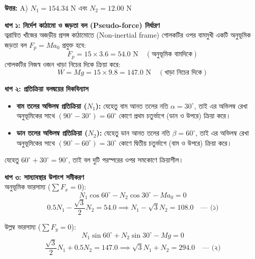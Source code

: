 \documentclass[12pt, a4paper]{article}
\begin{document}
\vspace{0.5em}
\begin{tcolorbox}[answerbox]
    \textbf{\color{success} উত্তর:} A) $N_1 = 154.34\text{ N}$ এবং $N_2 = 12.00\text{ N}$
\end{tcolorbox}
\vspace{1em}

\begin{tcolorbox}[solutionbox={সমাধান (Solution)}]
    \noindent
    \textbf{ধাপ ১: নির্দেশ কাঠামো ও জড়তা বল (Pseudo-force) নির্ধারণ} \\
    ত্বরান্বিত খাঁজের অজড়ীয় প্রসঙ্গ কাঠামোতে (Non-inertial frame) গোলকটির ওপর বামমুখী একটি অনুভূমিক জড়তা বল $F_p = M a_0$ প্রযুক্ত হবে:
    \[ F_p = 15 \times 3.6 = 54.0\text{ N} \quad (\text{অনুভূমিক বামদিকে}) \]
    গোলকটির নিজস্ব ওজন খাড়া নিচের দিকে ক্রিয়া করে:
    \[ W = M g = 15 \times 9.8 = 147.0\text{ N} \quad (\text{খাড়া নিচের দিকে}) \]

    \vspace{0.5em}
    \noindent
    \textbf{ধাপ ২: প্রতিক্রিয়া বলদ্বয়ের দিকবিন্যাস} \\
    \begin{itemize}[label={--}, leftmargin=1cm, itemsep=0.3em]
        \item \textbf{বাম তলের অভিলম্ব প্রতিক্রিয়া ($N_1$):} যেহেতু বাম আনত তলের নতি $\alpha = 30^\circ$, তাই এর অভিলম্ব রেখা অনুভূমিকের সাথে $(90^\circ - 30^\circ) = 60^\circ$ কোণে প্রথম চতুর্ভাগে (ডান ও উপরে) ক্রিয়া করে।
        \item \textbf{ডান তলের অভিলম্ব প্রতিক্রিয়া ($N_2$):} যেহেতু ডান আনত তলের নতি $\beta = 60^\circ$, তাই এর অভিলম্ব রেখা অনুভূমিকের সাথে $(90^\circ - 60^\circ) = 30^\circ$ কোণে দ্বিতীয় চতুর্ভাগে (বাম ও উপরে) ক্রিয়া করে।
    \end{itemize}
    যেহেতু $60^\circ + 30^\circ = 90^\circ$, তাই বল দুটি পরস্পরের ওপর সমকোণে ক্রিয়াশীল।

    \vspace{0.5em}
    \noindent
    \textbf{ধাপ ৩: সাম্যাবস্থার উপাংশ সমীকরণ} \\
    অনুভূমিক ভারসাম্য ($\sum F_x = 0$):
    \[ N_1 \cos 60^\circ - N_2 \cos 30^\circ - M a_0 = 0 \]
    \[ 0.5 N_1 - \frac{\sqrt{3}}{2} N_2 = 54.0 \implies N_1 - \sqrt{3} N_2 = 108.0 \quad \text{--- (১)} \]

    উল্লম্ব ভারসাম্য ($\sum F_y = 0$):
    \[ N_1 \sin 60^\circ + N_2 \sin 30^\circ - M g = 0 \]
    \[ \frac{\sqrt{3}}{2} N_1 + 0.5 N_2 = 147.0 \implies \sqrt{3} N_1 + N_2 = 294.0 \quad \text{--- (২)} \]


\end{tcolorbox}
\end{document}
